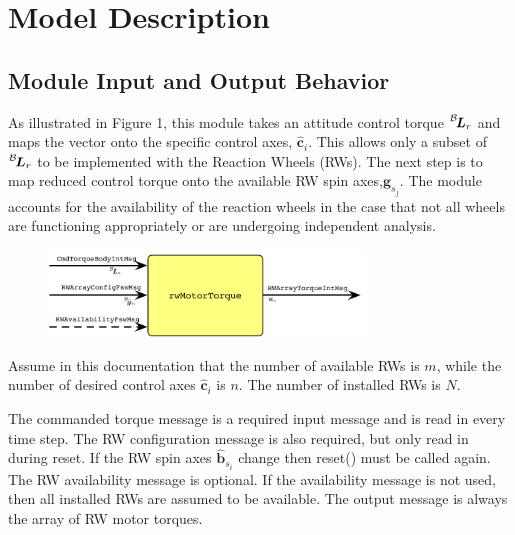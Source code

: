 

\section{Model Description}

\subsection{Module Input and Output Behavior}
As illustrated in Figure 1, this module takes an attitude control torque $\leftexp{B}{\bm L_{r}}$ and maps the vector onto the specific control axes, $\hat{\bm c}_{i}$.  This allows only a subset of $\leftexp{B}{\bm L_{r}}$ to be implemented with the Reaction Wheels (RWs).  The next step is to map reduced control torque onto  the available RW spin axes,$\hat{\bm g}_{s_j}$. The module accounts for the availability of the reaction wheels in the case that not all wheels are functioning appropriately or are undergoing independent analysis.  
\begin{figure}[b]
	\centering
	\includegraphics[width=0.75\textwidth]{Figures/moduleImg.pdf}
	\label{fig:moduleImg}\caption{}
\end{figure}
Assume in this documentation that the number of available RWs is $m$, while the number of desired control axes $\hat{\bm c}_{i}$ is $n$.  The number of installed RWs is $N$.

The commanded torque message is a required input message and is read in every time step.  The RW configuration message is also required, but only read in during reset.  If the RW spin axes $\hat{\bm b}_{s_{i}}$ change then reset() must be called again.  The RW availability message is optional.  If the availability message is not used, then all installed RWs are assumed to be available.  The output message is always the array of RW motor torques.  



